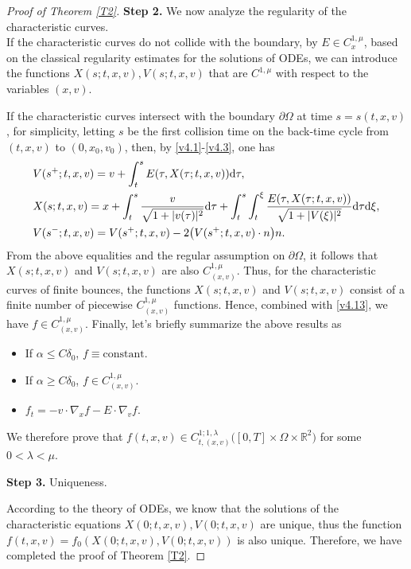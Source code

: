 \documentclass[11pt,reqno]{amsart}%
\theoremstyle{definition}
\theoremstyle{remark}
\begin{document}
\begin{proof}[Proof of Theorem \ref{T2}]


{\bf Step 2.} We now analyze the regularity of the characteristic curves.\\
If the characteristic curves do not collide with the boundary, by $E \in C^{1,\mu}_{x}$, based on the classical regularity estimates for the solutions of ODEs, we can introduce the functions $X(s; t,x,v),V(s;t,x,v)$  that are $C^{1,\mu}$ with respect to the variables $(x,v)$.

If the characteristic curves intersect with the boundary $\partial\Omega $ at time $s=s(t,x,v)$, for simplicity, letting $s$  be the first collision time on  the back-time cycle from $(t,x,v)$ to $(0,x_{0},v_{0})$, then,  by \eqref{v4.1}-\eqref{v4.3}, one has
\begin{align}
&V(s^{+};t,x,v)=v+\int^{s}_{t}E(\tau, X(\tau;t,x,v)){\rm d}\tau,\nonumber\\
&X(s;t,x,v)=x+\int^{s}_{t}\frac{v}{\sqrt{1+|v(\tau)|^{2}}}{\rm d}\tau+\int^{s}_{t}\int^{\xi}_{t}\frac{E(\tau,X(\tau;t,x,v))}{\sqrt{1+|V(\xi)|^{2}}}{\rm d}\tau{\rm d}\xi,\nonumber\\
&V(s^{-};t,x,v)=V(s^{+};t,x,v)-2\big(V(s^{+};t,x,v)\cdot n\big)n.\nonumber
\end{align}
From the above equalities and the regular assumption on $\partial\Omega$, it follows that  $X(s; t,x,v)$ and $V(s;t,x,v)$   are also  $C^{1,\mu}_{(x,v)}$.
Thus, for the  characteristic curves of finite bounces, the functions $X(s; t,x,v)$ and $V(s;t,x,v)$  consist of a finite number of piecewise $C^{1,\mu}_{(x,v)}$ functions.
Hence, combined with \eqref{v4.13}, we have $ f \in C^{1,\mu}_{(x,v)}$.
 Finally, let's briefly summarize the above results as
\begin{itemize}
  \item [(1)]If $\alpha \leq C \delta_{0}$, $f\equiv \text{constant}$.
  \item [(2)]If $\alpha \geq C \delta_{0}$, $f \in C^{1,\mu}_{(x,v)}$.
  \item [(3)]$f_{t}=-v\cdot \nabla_{x}f-E\cdot\nabla_{v}f.$
\end{itemize}
 We therefore prove that $f(t,x,v) \in C^{1;1,\lambda}_{t,(x,v)}\big([0,T]\times\Omega\times\mathbb{R}^{2}\big)$ for some $0< \lambda< \mu$.

{\bf Step 3.} Uniqueness.

According to the theory of ODEs,
we know that the solutions of the characteristic equations $X(0; t,x,v),V(0;t,x,v)$ are unique, thus the function $f(t,x,v)=f_{0}(X(0;t,x,v), V(0;t,x,v))$
is also unique. Therefore, we have completed the proof of Theorem \ref{T2}.
\end{proof}
\end{document}
